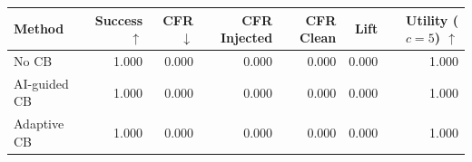\begin{tabular}{lrrrrrr}
\toprule
Method & Success $\uparrow$ & CFR $\downarrow$ & CFR Injected & CFR Clean & Lift & Utility ($c=5$) $\uparrow$ \\
\midrule
No CB & 1.000 & 0.000 & 0.000 & 0.000 & 0.000 & 1.000 \\
AI-guided CB & 1.000 & 0.000 & 0.000 & 0.000 & 0.000 & 1.000 \\
Adaptive CB & 1.000 & 0.000 & 0.000 & 0.000 & 0.000 & 1.000 \\
\bottomrule
\end{tabular}
